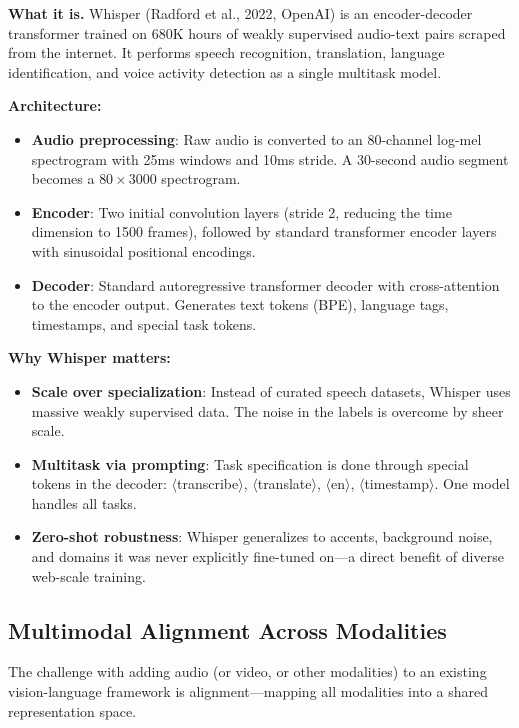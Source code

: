 \textbf{What it is.} Whisper (Radford et al., 2022, OpenAI) is an encoder-decoder transformer trained on 680K hours of weakly supervised audio-text pairs scraped from the internet. It performs speech recognition, translation, language identification, and voice activity detection as a single multitask model.

\textbf{Architecture:}
\begin{itemize}
    \item \textbf{Audio preprocessing}: Raw audio is converted to an 80-channel log-mel spectrogram with 25ms windows and 10ms stride. A 30-second audio segment becomes a $80 \times 3000$ spectrogram.
    \item \textbf{Encoder}: Two initial convolution layers (stride 2, reducing the time dimension to 1500 frames), followed by standard transformer encoder layers with sinusoidal positional encodings.
    \item \textbf{Decoder}: Standard autoregressive transformer decoder with cross-attention to the encoder output. Generates text tokens (BPE), language tags, timestamps, and special task tokens.
\end{itemize}

\textbf{Why Whisper matters:}
\begin{itemize}
    \item \textbf{Scale over specialization}: Instead of curated speech datasets, Whisper uses massive weakly supervised data. The noise in the labels is overcome by sheer scale.
    \item \textbf{Multitask via prompting}: Task specification is done through special tokens in the decoder: $\langle$transcribe$\rangle$, $\langle$translate$\rangle$, $\langle$en$\rangle$, $\langle$timestamp$\rangle$. One model handles all tasks.
    \item \textbf{Zero-shot robustness}: Whisper generalizes to accents, background noise, and domains it was never explicitly fine-tuned on---a direct benefit of diverse web-scale training.
\end{itemize}

\subsection{Multimodal Alignment Across Modalities}

The challenge with adding audio (or video, or other modalities) to an existing vision-language framework is alignment---mapping all modalities into a shared representation space.

